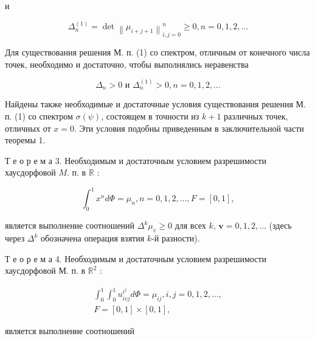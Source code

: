 \documentclass[10pt]{article}
\begin{document}
и



\[

\Delta_{n}^{(1)}=\operatorname{det}\left\|\mu_{i+j+1}\right\|_{i, j=0}^{n} \geqslant 0, n=0,1,2, \ldots

\]



Для существования решения М. п. (1) со спектром, отличным от конечного числа точек, необходимо и достаточно, чтобы выполнялись неравенства



\[

\Delta_{n}>0 \text { и } \Delta_{n}^{(1)}>0, n=0,1,2, \ldots

\]



Найдены также необходимые и достаточные условия существования решения М. п. (1) со спектром $\sigma(\psi)$, состоящем в точности из $k+1$ различных точек, отличных от $x=0$. Эти условия подобны приведенным в заключительной части теоремы 1.



Т е о р е м а 3. Необходимым и достаточным условием разрешимости хаусдорфовой $M$. п. в $\mathbb{R}$ :



\[

\int_{0}^{1} x^{n} d \Phi=\mu_{n}, n=0,1,2, \ldots, F=[0,1],

\]



является выполнение соотношений $\Delta^{k} \mu_{v} \geqslant 0$ для всех $k$, $\boldsymbol{v}=0,1,2, \ldots$ (здесь через $\Delta^{k}$ обозначена операция взятия $k$-й разности).



Т е о р е м а 4. Необходимым и достаточным условием разрешимости хаусдорфовой М. п. в $\mathbb{R}^{2}$ :



\[

\begin{gathered}

\int_{0}^{1} \int_{0}^{1} u_{i v j}^{i^{j}} d \Phi=\mu_{i j}, i, j=0,1,2, \ldots, \\

F=[0,1] \times[0,1],

\end{gathered}

\]



является выполнение соотношений
\end{document}
